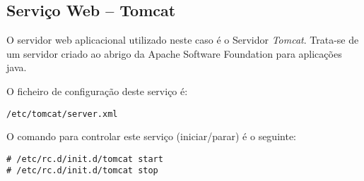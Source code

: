 \subsection{Serviço Web -- Tomcat}

O servidor web aplicacional utilizado neste caso é o Servidor \emph{Tomcat}. Trata-se de um servidor criado ao abrigo da Apache Software Foundation para aplicações java.

O ficheiro de configuração deste serviço é:

\begin{Verbatim}[commandchars=\\\{\}]
/etc/tomcat/server.xml
\end{Verbatim}

O comando para controlar este serviço (iniciar/parar) é o seguinte:

\begin{Verbatim}[commandchars=\\\{\}]
# /etc/rc.d/init.d/tomcat start
# /etc/rc.d/init.d/tomcat stop
\end{Verbatim}

